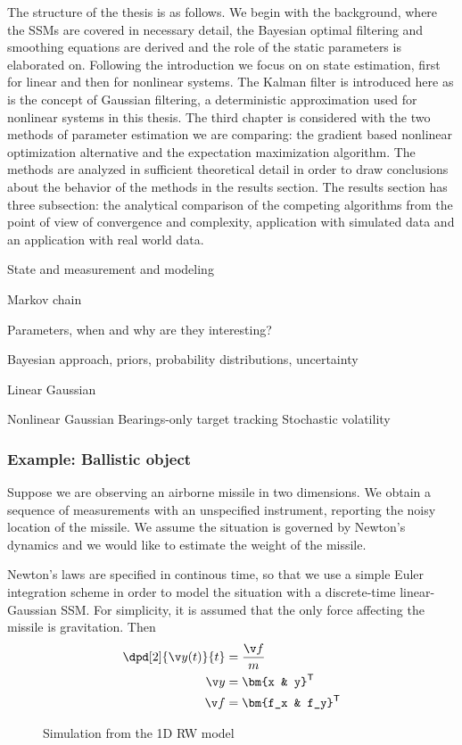 The structure of the thesis is as follows. We begin with the background, where
the SSMs are covered in necessary detail, the Bayesian optimal filtering
and smoothing equations are derived and the role of the static parameters is elaborated
on. Following the introduction we focus on on state estimation, first for linear
and then for nonlinear systems. The Kalman filter is introduced here as is the
concept of Gaussian filtering, a deterministic approximation used for nonlinear systems 
in this thesis. The third chapter is considered with the two methods
of parameter estimation we are comparing: the gradient based nonlinear optimization alternative
and the expectation maximization algorithm. The methods are analyzed in sufficient
theoretical detail in order to draw conclusions about the behavior of the methods
in the results section. The results section has three subsection: the analytical 
comparison of the competing algorithms from the point of view of convergence
and complexity, application with simulated data and an application with real world data.

State and measurement and modeling

Markov chain

Parameters, when and why are they interesting?

Bayesian approach, priors, probability distributions, uncertainty

Linear Gaussian 
  


Nonlinear Gaussian
  Bearings-only target tracking
  Stochastic volatility



 

\parencite{Murphy2002}
\subsubsection*{Example: Ballistic object}
Suppose we are observing an airborne missile in two dimensions.
We obtain a sequence of measurements with an unspecified instrument,
reporting the noisy location of the missile. We assume the situation
is governed by Newton's dynamics and we would like to estimate the weight
of the missile.

Newton's laws are specified in continous time, so that we use a simple
Euler integration scheme in order to model the situation with a discrete-time 
linear-Gaussian SSM. For simplicity, it is assumed that the only force affecting
the missile is gravitation. Then
\begin{align}
	\dpd[2]{\y(t)}{t} &= \frac{\f}{m}\\
	\y &= \bm{x & y}^\tr\\
	\f &= \bm{f_x & f_y}^\tr	
\end{align}

 
\begin{figure}[htp]
\begin{center}
  \caption{Simulation from the 1D RW model}
  \label{fig:rw1d}
\end{center}
\end{figure}
